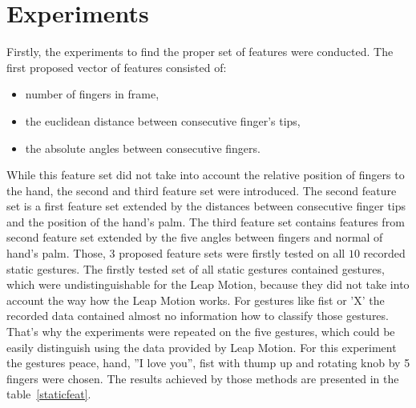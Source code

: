 \section{Experiments}
\label{static:exp}

Firstly, the experiments to find the proper set of features were conducted. The first proposed vector of features consisted of:
\begin{itemize}
\item number of fingers in frame,
\item the euclidean distance between consecutive finger's tips,
\item the absolute angles between consecutive fingers.
\end{itemize} 

While this feature set did not take into account the relative position of fingers to the hand, the second and third feature set were introduced.
The second feature set is a first feature set extended by the distances between consecutive finger tips and the position of the hand's palm.
The third feature set contains features from second feature set extended by the five angles between fingers and normal of hand's palm.
Those, 3 proposed feature sets were firstly tested on all $10$ recorded static gestures.
The firstly tested set of all static gestures contained gestures, which were undistinguishable for the Leap Motion, because they did not take into account the way how the Leap Motion works. 
For gestures like fist or 'X' the recorded data contained almost no information how to classify those gestures.
That's why the experiments were repeated on the five gestures, which could be easily distinguish using the data provided by Leap Motion. 
For this experiment the gestures peace, hand, ''I love you'', fist with thump up and rotating knob by 5 fingers were chosen.
The results achieved by those methods are presented in the table~\ref{staticfeat}.

